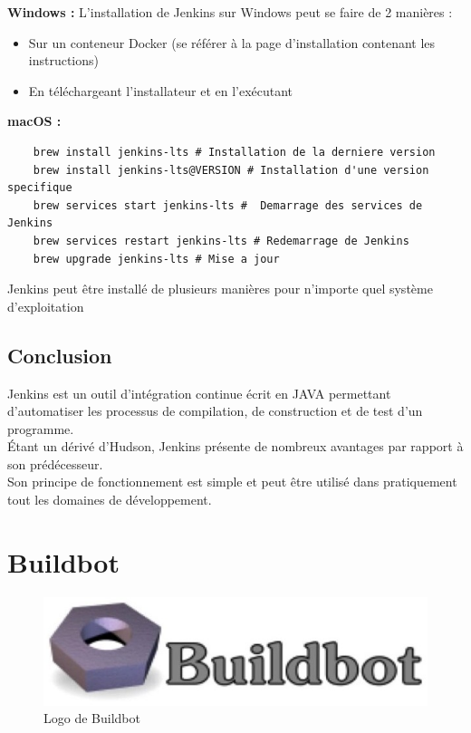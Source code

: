 \documentclass[12pt]{article}
\begin{document}
\vspace{0.5cm}

\textbf{Windows :}
L'installation de Jenkins sur Windows peut se faire de 2 manières :
\begin{itemize}
    \item Sur un conteneur Docker (se référer à la page d'installation contenant les instructions)
    \item En téléchargeant l'installateur et en l'exécutant
\end{itemize}

\vspace{0.5cm}

\textbf{macOS :}
\begin{lstlisting}
    brew install jenkins-lts # Installation de la derniere version
    brew install jenkins-lts@VERSION # Installation d'une version specifique
    brew services start jenkins-lts #  Demarrage des services de Jenkins
    brew services restart jenkins-lts # Redemarrage de Jenkins
    brew upgrade jenkins-lts # Mise a jour
\end{lstlisting}

Jenkins peut être installé de plusieurs manières pour n'importe quel système d'exploitation
\subsection{Conclusion}
Jenkins est un outil d'intégration continue écrit en JAVA permettant d'automatiser les processus de compilation, de construction et de test d'un programme.
\\
Étant un dérivé d'Hudson, Jenkins présente de nombreux avantages par rapport à son prédécesseur.
\\
Son principe de fonctionnement est simple et peut être utilisé dans pratiquement tout les domaines de développement.

\section{Buildbot}

\begin{figure}[ht]
    \includegraphics[scale=0.6]{images/buildbot.jpg}
    \caption{Logo de Buildbot}
\end{figure}
\end{document}
